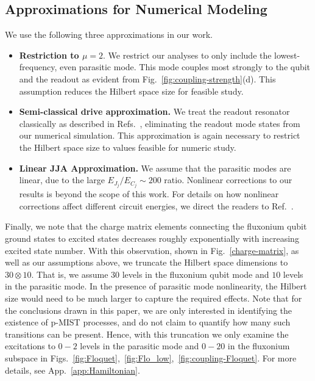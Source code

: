 \documentclass[%
reprint,
superscriptaddress,
 amsmath,amssymb,
 aps,
 prx,
longbibliography,
floatfix,
]{revtex4-2}
\begin{document}
\subsection{Approximations for Numerical Modeling}\label{app:numerics}
We use the following three approximations in our work.
\begin{itemize}
    \item \textbf{ Restriction to $\mu=2$}. We restrict our analyses to only include the lowest-frequency, even parasitic mode. This mode couples most strongly to the qubit and the readout as evident from Fig.~\ref{fig:coupling-strength}(d). This assumption reduces the Hilbert space size for feasible study. %

    \item \textbf{ Semi-classical drive approximation.}  We treat the readout resonator classically as described in Refs.~\cite{xiao2023diagrammatic,dumas2024unified,cohen2023reminiscence,khezri2023measurement}, eliminating the readout mode states from our numerical simulation. This approximation is again necessary to restrict the Hilbert space size to values feasible for numeric study. %

    \item \textbf{ Linear JJA Approximation.} We assume that the parasitic modes are linear, due to the large $E_{J_j}/E_{C_j} \sim 200$ ratio. Nonlinear corrections to our results is beyond the scope of this work. For details on how nonlinear corrections affect different circuit energies, we direct the readers to Ref.~\cite{viola2015collective}. 
    \end{itemize}
Finally, we note that the charge matrix elements connecting the fluxonium qubit ground states to excited states decreases roughly exponentially with increasing excited state number. With this observation, shown in Fig.~\ref{charge-matrix}, as well as our assumptions above, we truncate the Hilbert space dimensions to $30\otimes 10$. That is, we assume $30$ levels in the fluxonium qubit mode and $10$ levels in the parasitic mode. In the presence of parasitic mode nonlinearity, the Hilbert size would need to be much larger to capture the required effects. Note that for the conclusions drawn in this paper, we are only interested in identifying the existence of p-MIST processes, and do not claim to quantify how many such transitions can be present. Hence, with this truncation we only examine the excitations to $0-2$ levels in the parasitic mode and $0-20$ in the fluxonium subspace in Figs.~\ref{fig:Floquet},~\ref{fig:Flo_low},~\ref{fig:coupling-Floquet}. For more details, see App.~\ref{app:Hamiltonian}.
\end{document}
